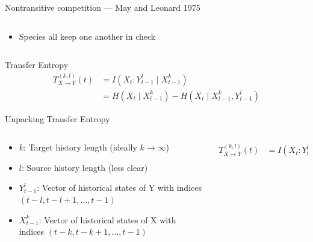 \documentclass{cubeamer}
\begin{document}
\begin{frame}{Nontransitive competition --- May and Leonard 1975}
    \begin{columns}
        \begin{column}{0.48\textwidth}
            \begin{itemize}
                \item Species all keep one another in check
            \end{itemize}
        \end{column}
    \end{columns}
\end{frame}

\begin{frame}{Transfer Entropy}
    \huge
    \begin{align*}
       T^{(k, l)}_{X \rightarrow Y}(t) &= I \left(X_t : Y_{t-1}^{l} \mid X_{t-1}^{k} \right ) \\
                                    &= H \left ( X_{t} \mid X_{t-1}^{k} \right ) - H \left ( X_t \mid    X_{t-1}^{k}, Y_{t-1}^{l} \right )
    \end{align*}
\end{frame}

\begin{frame}{Unpacking Transfer Entropy}
    \begin{columns}
        \begin{column}{0.7\textwidth}
            \begin{itemize}
                \item $k$: Target history length (ideally $k \rightarrow \infty$)
                \item $l$: Source history length (less clear)
                \item $Y_{t-1}^l$: Vector of historical states of Y with indices $(t-l, t-l+1, ..., t - 1)$
                \item $X_{t-1}^k$: Vector of historical states of X with indices $(t-k, t-k+1,..., t-1)$
            \end{itemize}
            
        \end{column}
        \begin{column}{0.3\textwidth}
            \begin{align*}
                T^{(k, l)}_{X \rightarrow Y}(t) &= I \left(X_t : Y_{t-1}^{l} \mid X_{t-1}^{k} \right )
            \end{align*}
        \end{column}
    \end{columns}
            
\end{frame}
\end{document}
